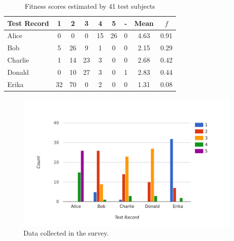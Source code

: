 \begin{table}[H]
\centering
\begin{tabular}{l||c|c|c|c|c|c||c|c}
Test Record & 1 & 2  & 3  & 4  & 5  & - & Mean & $f$ \\
\hline
Alice       & 0  & 0  & 0  & 15 & 26 & 0 & 4.63 & 0.91 \\
Bob         & 5  & 26 & 9  & 1  & 0  & 0 & 2.15 & 0.29 \\
Charlie     & 1  & 14 & 23 & 3  & 0  & 0 & 2.68 & 0.42 \\
Donald      & 0  & 10 & 27 & 3  & 0  & 1 & 2.83 & 0.44 \\
Erika       & 32 & 70 & 0  & 2  & 0  & 0 & 1.31 & 0.08 \\
\end{tabular}
\caption[Survey: Estimated Fitness Scores]{Fitness scores estimated by 41 test subjects}
\label{tab:survey_raw}
\end{table}

\begin{figure}[!t]
    \centering
    \includegraphics[width=\textwidth]{images/survey_raw.png}
    \caption[Diagram: Survey Data]{Data collected in the survey.}
    \label{survey_raw}
\end{figure}

